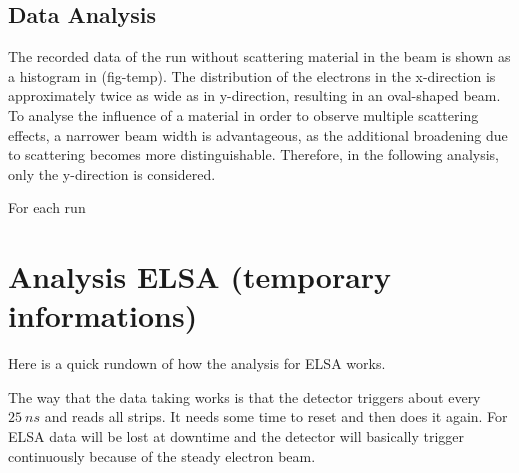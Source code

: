 \documentclass[sn-mathphys-num,iicol]{sn-jnl}
\theoremstyle{thmstyleone}
\theoremstyle{thmstyletwo}
\theoremstyle{thmstylethree}
\begin{document}
\subsection{Data Analysis}
The recorded data of the run without scattering material in the beam is shown as a histogram in (fig-temp). The distribution of the electrons in the x-direction is approximately twice as wide as in y-direction, resulting in an oval-shaped beam.
To analyse the influence of a material in order to observe multiple scattering effects, a narrower beam width is advantageous, as the additional broadening due to scattering becomes more distinguishable. Therefore, in the following analysis, only the y-direction is considered.

For each run 






\clearpage
\section{Analysis ELSA (\textbf{temporary informations})}
Here is a quick rundown of how the analysis for ELSA works.

The way that the data taking works is that the detector triggers about every $\SI{25}{ns}$ and reads all strips.
It needs some time to reset and then does it again.
For ELSA data will be lost at downtime and the detector will basically trigger continuously because of the steady electron beam.
\end{document}
